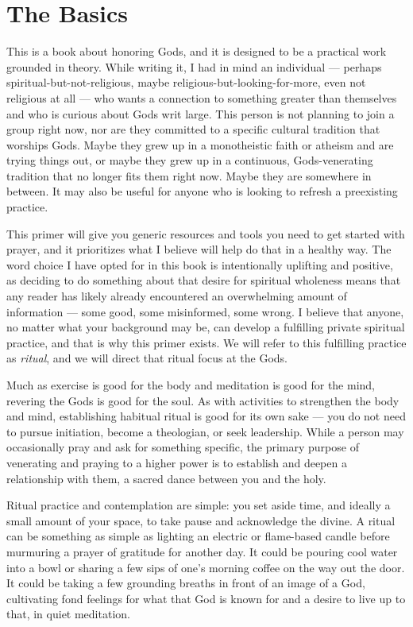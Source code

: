 \documentclass[
]{book}
\begin{document}
\hypertarget{the-basics}{%
\section{The Basics}\label{the-basics}}

This is a book about honoring Gods, and it is designed to be a practical work grounded in theory. While writing it, I had in mind an individual --- perhaps spiritual-but-not-religious, maybe religious-but-looking-for-more, even not religious at all --- who wants a connection to something greater than themselves and who is curious about Gods writ large. This person is not planning to join a group right now, nor are they committed to a specific cultural tradition that worships Gods. Maybe they grew up in a monotheistic faith or atheism and are trying things out, or maybe they grew up in a continuous, Gods-venerating tradition that no longer fits them right now. Maybe they are somewhere in between. It may also be useful for anyone who is looking to refresh a preexisting practice.

This primer will give you generic resources and tools you need to get started with prayer, and it prioritizes what I believe will help do that in a healthy way. The word choice I have opted for in this book is intentionally uplifting and positive, as deciding to do something about that desire for spiritual wholeness means that any reader has likely already encountered an overwhelming amount of information --- some good, some misinformed, some wrong. I believe that anyone, no matter what your background may be, can develop a fulfilling private spiritual practice, and that is why this primer exists. We will refer to this fulfilling practice as \emph{ritual}, and we will direct that ritual focus at the Gods.

Much as exercise is good for the body and meditation is good for the mind, revering the Gods is good for the soul. As with activities to strengthen the body and mind, establishing habitual ritual is good for its own sake --- you do not need to pursue initiation, become a theologian, or seek leadership. While a person may occasionally pray and ask for something specific, the primary purpose of venerating and praying to a higher power is to establish and deepen a relationship with them, a sacred dance between you and the holy.

Ritual practice and contemplation are simple: you set aside time, and ideally a small amount of your space, to take pause and acknowledge the divine. A ritual can be something as simple as lighting an electric or flame-based candle before murmuring a prayer of gratitude for another day. It could be pouring cool water into a bowl or sharing a few sips of one's morning coffee on the way out the door. It could be taking a few grounding breaths in front of an image of a God, cultivating fond feelings for what that God is known for and a desire to live up to that, in quiet meditation.
\end{document}
